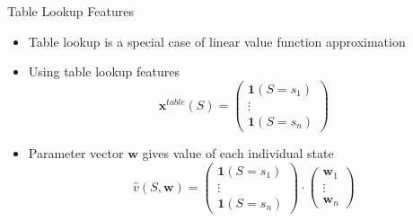 \bgroup
\begin{frame}{Table Lookup Features}
\begin{itemize}
\item Table lookup is a special case of linear value function approximation
\item Using table lookup features
\begin{equation*}
\textbf{x}^{table}(S)=\left(\begin{array}{c}
\textbf{1}(S=s_1)\\
\vdots\\
\textbf{1}(S=s_n)
\end{array}
\right)
\end{equation*}
\item Parameter vector $\textbf{w}$ gives value of each individual state
\begin{equation*}
\hat{v}(S, \textbf{w})=\left(\begin{array}{c}
\textbf{1}(S=s_1)\\
\vdots\\
\textbf{1}(S=s_n)
\end{array}\right)
\cdot
\left(\begin{array}{c}
\textbf{w}_1\\
\vdots\\
\textbf{w}_n
\end{array}\right)
\end{equation*}
\end{itemize}
\end{frame}
\egroup